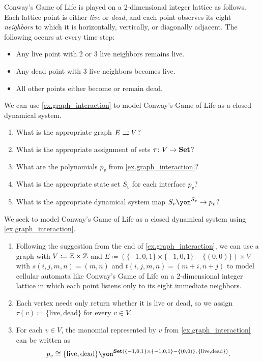 \documentclass[Book-Poly]{subfiles}
\begin{document}
\begin{exercise}\label{exc.conway}
Conway's Game of Life is played on a 2-dimensional integer lattice as follows.
Each lattice point is either \emph{live} or \emph{dead}, and each point observes its eight \emph{neighbors} to which it is horizontally, vertically, or diagonally adjacent.
The following occurs at every time step:
\begin{itemize}
    \item Any live point with 2 or 3 live neighbors remains live.
    \item Any dead point with 3 live neighbors becomes live.
    \item All other points either become or remain dead.
\end{itemize}
We can use \cref{ex.graph_interaction} to model Conway's Game of Life as a closed dynamical system.
\begin{enumerate}
	\item What is the appropriate graph $E\rightrightarrows V$?
	\item What is the appropriate assignment of sets $\tau\colon V\to\mathbf{Set}$?
	\item What are the polynomials $p_v$ from \cref{ex.graph_interaction}?
	\item What is the appropriate state set $S_v$ for each interface $p_v$?
	\item What is the appropriate dynamical system map $S_v\yon^{S_v}\to p_v$?
\qedhere
\end{enumerate}
\begin{solution}
We seek to model Conway's Game of Life as a closed dynamical system using \cref{ex.graph_interaction}.
\begin{enumerate}
    \item Following the suggestion from the end of \cref{ex.graph_interaction}, we can use a graph with $V\coloneq\mathbb{Z}\times\mathbb{Z}$ and $E\coloneqq(\{-1,0,1\}\times\{-1,0,1\}-\{(0,0)\})\times V$ with $s(i,j,m,n)=(m,n)$ and $t(i,j,m,n)=(m+i,n+j)$ to model cellular automata like Conway's Game of Life on a 2-dimensional integer lattice in which each point listens only to its eight immediate neighbors.
    \item Each vertex needs only return whether it is live or dead, so we assign $\tau(v)\coloneqq\{\text{live},\text{dead}\}$ for every $v\in V$.
    \item For each $v\in V$, the monomial represented by $v$ from \cref{ex.graph_interaction} can be written as
    \[
        p_v\iso\{\text{live},\text{dead}\}\yon^{\smset(\{-1,0,1\}\times\{-1,0,1\}-\{(0,0)\},\, \{\text{live},\text{dead}\})}.
\]
\end{enumerate}
\end{solution}
\end{exercise}
\end{document}
